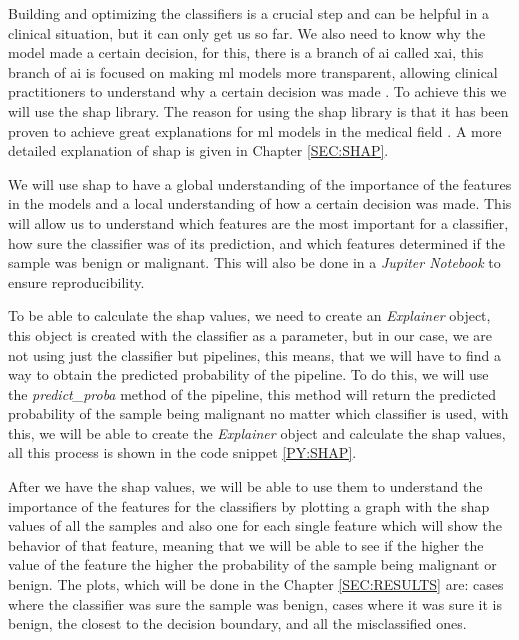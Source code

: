 Building and optimizing the classifiers is a crucial step and can be helpful in a clinical situation, but it can only get us so far. We also need to know why the model made a certain decision, for this, there is a branch of \ac{ai} called \acl{xai}, this branch of \ac{ai} is focused on making \ac{ml} models more transparent, allowing clinical practitioners to understand why a certain decision was made \cite{borys_explainable_2023}. To achieve this we will use the \acl{shap} library. The reason for using the \ac{shap} library \cite{lundberg_unified_2017} is that it has been proven to achieve great explanations for \ac{ml} models in the medical field \cite{massafra_analyzing_2023}. A 
more detailed
explanation of \ac{shap} is given in Chapter \ref{SEC:SHAP}.

We will use \ac{shap} to have a global understanding of the importance of the features in the models and a local understanding of how a certain decision was made. This will allow us to understand which features are the most important for a classifier, how sure the classifier was of its prediction, and which features determined if the sample was benign or malignant. This will also be done in a \textit{Jupiter Notebook} to ensure reproducibility.

To be able to calculate the \ac{shap} values, we need to create an \textit{Explainer} object, this object is created with the classifier as a parameter, but in our case, we are not using just the classifier but pipelines, this means, that we will have to find a way to obtain the predicted probability of the pipeline. To do this, we will use the \textit{predict\_proba} method of the pipeline, this method will return the predicted probability of the sample being malignant no matter which classifier is used, with this, we will be able to create the \textit{Explainer} object and calculate the \ac{shap} values, all this process is shown in the code snippet \ref{PY:SHAP}.


After we have the \ac{shap} values, we will be able to use them to understand the importance of the features for the classifiers by plotting a graph with the \ac{shap} values of all the samples and also one for each single feature which will show the behavior of that feature, meaning that we will be able to see if the higher the value of the feature the higher the probability of the sample being malignant or benign. The plots, which will be done in the Chapter \ref{SEC:RESULTS} are: cases where the classifier was sure the sample was benign, cases where it was sure it is benign, the closest to the decision boundary, and all the misclassified ones.





